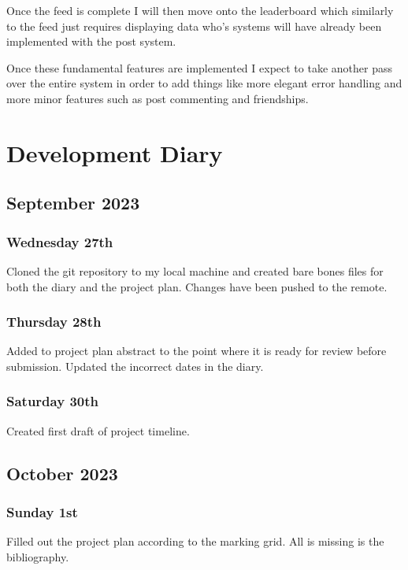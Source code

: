 \documentclass[]{final_report}
\begin{document}
Once the feed is complete I will then move onto the leaderboard which similarly to the feed just requires displaying data who's systems will have already been implemented with the post system.

Once these fundamental features are implemented I expect to take another pass over the entire system in order to add things like more elegant error handling and more minor features such as post commenting and friendships.

\chapter{Development Diary}

\section{September 2023} 

\subsection{Wednesday 27th} 

Cloned the git repository to my local machine and created bare bones files for both the diary and the project plan. Changes have been pushed to the remote.

\subsection{Thursday 28th} 

Added to project plan abstract to the point where it is ready for review before submission. Updated the incorrect dates in the diary.

\subsection{Saturday 30th} 

Created first draft of project timeline.

\section{October 2023} 

\subsection{Sunday 1st} 

Filled out the project plan according to the marking grid. All is missing is the bibliography.
\end{document}
